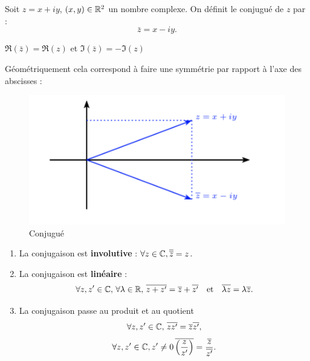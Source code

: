 \documentclass[a4paper, 11pt]{article}
\begin{document}
\begin{defi}
Soit $z=x+iy$, $(x,y)\in \mathbb{R}^2$ un nombre complexe. On définit le conjugué de $z$ par :
$$\bar{z} =x-iy.$$
\end{defi}
\begin{remarques}
\item $\Re(\bar{z}) =\Re(z)$ et $\Im(\bar{z}) =-\Im(z)$
\item Géométriquement cela correspond à faire une symmétrie par rapport à l'axe des abscisses :

\begin{figure}[h]
\centering
\includegraphics[scale=0.8]{images/conjugue}
\vspace{-0.4cm}
\caption{Conjugué}
\end{figure}
\end{remarques}


\begin{prop}
\begin{enumerate}
\item La conjugaison est \textbf{involutive} : $\forall z\in \mathbb{C}, \overline{\overline{z}} =z$.
\item La conjugaison est \textbf{linéaire } : 
$$\forall z,z'\in \mathbb{C},  \, \forall \lambda\in \mathbb{R},\,  \overline{z+z'} =\overline{z}+\overline{z'} \quad\text{et} \quad  \overline{\lambda z} =  \lambda \overline{z}.$$
\item La conjugaison  passe au produit et au quotient 
$$\forall z,z'\in \mathbb{C},  \,\overline{zz'} =\overline{z}\overline{z'},$$
$$\forall z,z'\in \mathbb{C}, z'\neq 0 \,\overline{\left(\frac{z}{z'}\right)} =\frac{\overline{z}}{\overline{z'}}.$$
\end{enumerate}
\end{prop}
\end{document}
